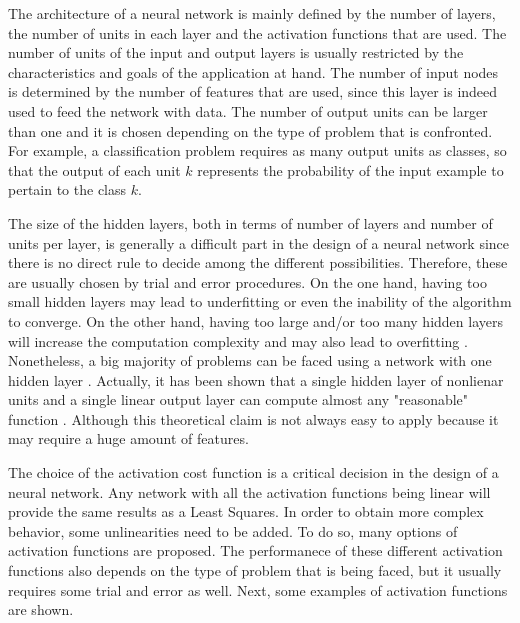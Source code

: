 \documentclass[a4paper, report, oneside, UKenglish]{memoir}
\begin{document}
The architecture of a neural network is mainly defined by the number of layers, the number of units in each layer and the activation functions that are used. The number of units of the input and output layers is usually restricted by the characteristics and goals of the application at hand. The number of input nodes is determined by the number of features that are used, since this layer is indeed used to feed the network with data. The number of output units can be larger than one and it is chosen depending on the type of problem that is confronted. For example, a classification problem requires as many output units as classes, so that the output of each unit $k$ represents the probability of the input example to pertain to the class $k$. 

The size of the hidden layers, both in terms of number of layers and number of units per layer, is generally a difficult part in the design of a neural network since there is no direct rule to decide among the different possibilities. Therefore, these are usually chosen by trial and error procedures. On the one hand, having too small hidden layers may lead to underfitting or even the inability of the algorithm to converge. On the other hand, having too large and/or too many hidden layers will increase the computation complexity and may also lead to overfitting \cite{aggarwal_neural_2018}. Nonetheless, a big majority of problems can be faced using a network with one hidden layer \cite{aggarwal_neural_2018}. Actually, it has been shown that a single hidden layer of nonlienar units and a single linear output layer can compute almost any "reasonable" function \cite{hornik_multilayer_1989}. Although this theoretical claim is not always easy to apply because it may require a huge amount of features.

The choice of the activation cost function is a critical decision in the design of a neural network. Any network with all the activation functions being linear will provide the same results as a Least Squares. In order to obtain more complex behavior, some unlinearities need to be added. To do so, many options of activation functions are proposed. The performanece of these different activation functions also depends on the type of problem that is being faced, but it usually requires some trial and error as well. Next, some examples of activation functions are shown.
\end{document}
